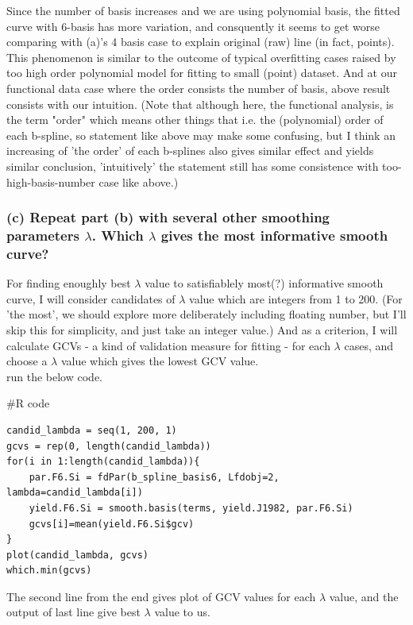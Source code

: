 \documentclass{article}
\newenvironment{Rcode}%
{%
    \begin{mdframed}
    \#R code
    \begin{small}
}
{%
    \end{small}
    \end{mdframed}
}
\begin{document}
Since the number of basis increases and we are using polynomial basis, the fitted curve with 6-basis has more variation,
and consquently it seems to get worse comparing with (a)'s 4 basis case to explain original (raw) line (in fact, points). 
This phenomenon is similar to the outcome of typical overfitting cases raised by too high order polynomial model for fitting to small (point) dataset.
And at our functional data case where the order consists the number of basis, above result consists with our intuition.
(Note that although here, the functional analysis, is the term "order" which means other things that i.e. the (polynomial) order of each b-spline,
so statement like above may make some confusing, but I think an increasing of 'the order' of each b-splines also gives similar effect and yields similar conclusion,
'intuitively' the statement still has some consistence with too-high-basis-number case like above.)

\newpage
\subsubsection*{(c) Repeat part (b) with several other smoothing parameters $\lambda$. Which $\lambda$ gives the most informative smooth curve?}

For finding enoughly best $\lambda$ value to satisfiablely most(?) informative smooth curve,
I will consider candidates of $\lambda$ value which are integers from 1 to 200. 
(For 'the most', we should explore more deliberately including floating number, but I'll skip this for simplicity, and just take an integer value.)
And as a criterion, I will calculate GCVs - a kind of validation measure for fitting - for each $\lambda$ cases,
and choose a $\lambda$ value which gives the lowest GCV value. \\
run the below code.
\begin{Rcode}
    \begin{verbatim}
candid_lambda = seq(1, 200, 1)
gcvs = rep(0, length(candid_lambda))
for(i in 1:length(candid_lambda)){
    par.F6.Si = fdPar(b_spline_basis6, Lfdobj=2, lambda=candid_lambda[i])
    yield.F6.Si = smooth.basis(terms, yield.J1982, par.F6.Si)
    gcvs[i]=mean(yield.F6.Si$gcv)
}
plot(candid_lambda, gcvs)
which.min(gcvs)
    \end{verbatim}
\end{Rcode}
The second line from the end gives plot of GCV values for each $\lambda$ value, and
the output of last line give best $\lambda$ value to us.
\end{document}
